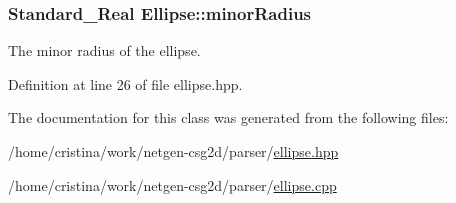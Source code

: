 \hypertarget{class_ellipse_a671ed5cb57cec3363e1197b6b88b9e62}{
\subsubsection[{minorRadius}]{\setlength{\rightskip}{0pt plus 5cm}Standard\_\-Real {\bf Ellipse::minorRadius}}}
\label{class_ellipse_a671ed5cb57cec3363e1197b6b88b9e62}


The minor radius of the ellipse. 



Definition at line 26 of file ellipse.hpp.



The documentation for this class was generated from the following files:\begin{DoxyCompactItemize}
\item 
/home/cristina/work/netgen-\/csg2d/parser/\hyperlink{ellipse_8hpp}{ellipse.hpp}\item 
/home/cristina/work/netgen-\/csg2d/parser/\hyperlink{ellipse_8cpp}{ellipse.cpp}\end{DoxyCompactItemize}
